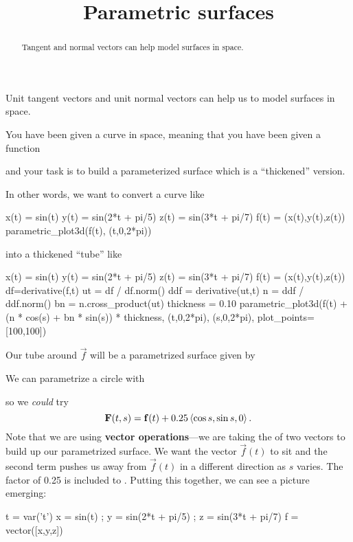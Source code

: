 \documentclass{ximera}
\title[Dig-In:]{Parametric surfaces}
\begin{document}
\begin{abstract}
  Tangent and normal vectors can help model surfaces in space.
\end{abstract}
\maketitle

Unit tangent vectors and unit normal vectors can help us to model
surfaces in space.

\begin{example}
  You have been given a curve in space, meaning that you have been
  given a function
  \begin{multipleChoice}
  \end{multipleChoice}
  and your task is to build a parameterized surface which is a
  ``thickened'' version.
  
  In other words, we want to convert a curve like
  \begin{sageOutput}
x(t) = sin(t)
y(t) = sin(2*t + pi/5)
z(t) = sin(3*t + pi/7)
f(t) = (x(t),y(t),z(t))
parametric_plot3d(f(t), (t,0,2*pi))
  \end{sageOutput}
  into a thickened ``tube'' like
  \begin{sageOutput}
x(t) = sin(t)
y(t) = sin(2*t + pi/5)
z(t) = sin(3*t + pi/7)
f(t) = (x(t),y(t),z(t))
df=derivative(f,t)
ut = df / df.norm()
ddf = derivative(ut,t)
n = ddf / ddf.norm()
bn = n.cross_product(ut)
thickness = 0.10
parametric_plot3d(f(t) + (n * cos(s) + bn * sin(s)) * thickness, (t,0,2*pi), (s,0,2*pi), plot_points=[100,100])
  \end{sageOutput}

  Our tube around $\vec{f}$ will be a parametrized surface given by 
  \begin{multipleChoice}
  \end{multipleChoice}

  We can parametrize a circle with
  \begin{multipleChoice}
  \end{multipleChoice}
  so we \textit{could} try
  \[
    \mathbf{F}(t,s) = \mathbf{f}(t) + 0.25 \left\langle \cos s, \sin s, 0\right\rangle.
  \]
  Note that we are using \textbf{vector operations}---we are taking the
 of two vectors to build up our parametrized surface.  We want the vector $\vec{f}(t)$ to sit  and the second term pushes us away from $\vec{f}(t)$ in a different direction as $s$ varies.  The factor of 0.25 is included to .  Putting this together, we can see a picture emerging:
  \begin{sageCell}
t = var('t')
x = sin(t) ; y = sin(2*t + pi/5) ; z = sin(3*t + pi/7)
f = vector([x,y,z])


\end{sageCell}
\end{example}
\end{document}
